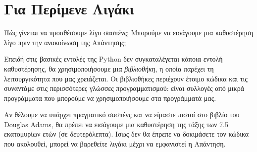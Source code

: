 \documentclass[a4paper,11pt,oneside]{book}
\begin{document}


\section{Για Περίμενε Λιγάκι}

\begin{question}
Πώς γίνεται να προσθέσουμε λίγο σασπένς; Μπορούμε να εισάγουμε μια καθυστέρηση λίγο πριν την ανακοίνωση της Απάντησης;
\end{question}

Επειδή στις βασικές εντολές της Python δεν συγκαταλέγεται κάποια εντολή καθυστέρησης, θα χρησιμοποιήσουμε μια \emph{βιβλιοθήκη}, η οποία παρέχει τη λειτουργικότητα που μας χρειάζεται. Οι βιβλιοθήκες περιέχουν έτοιμο κώδικα και τις συναντάμε στις περισσότερες γλώσσες προγραμματισμού: είναι συλλογές από μικρά προγράμματα που μπορούμε να χρησιμοποιήσουμε στα προγράμματά μας.

\clearpage

Αν θέλουμε να υπάρχει πραγματικό σασπένς και να είμαστε πιστοί στο βιβλίο του Douglas Adams, θα πρέπει να εισάγουμε μια καθυστέρηση της τάξης των 7.5 εκατομυρίων ετών (σε δευτερόλεπτα). Ίσως δεν θα έπρεπε να δοκιμάσετε τον κώδικα που ακολουθεί, μπορεί να βαρεθείτε λιγάκι μέχρι να εμφανιστεί η Απάντηση.

\end{document}
